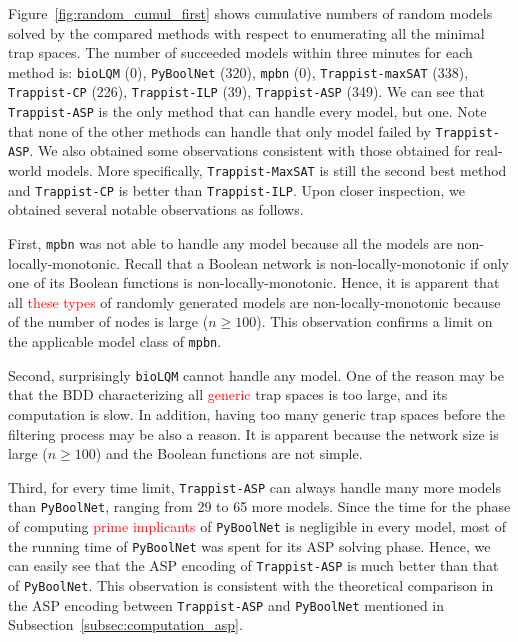 \documentclass[preprint,12pt]{elsarticle}
\newcommand{\change}[1]{\textcolor{red}{#1}}
\begin{document}
Figure~\ref{fig:random_cumul_first} shows cumulative numbers of random models solved by the compared methods with respect to enumerating all the minimal trap spaces.
The number of succeeded models within three minutes for each method is: \texttt{bioLQM} (0), \texttt{PyBoolNet} (320), \texttt{mpbn} (0), \texttt{Trappist-maxSAT} (338), \texttt{Trappist-CP} (226), \texttt{Trappist-ILP} (39), \texttt{Trappist-ASP} (349).
We can see that \texttt{Trappist-ASP} is the only method that can handle every model, but one.
Note that none of the other methods can handle that only model failed by \texttt{Trappist-ASP}.
We also obtained some observations consistent with those obtained for real-world models.
More specifically, \texttt{Trappist-MaxSAT} is still the second best method and \texttt{Trappist-CP} is better than \texttt{Trappist-ILP}.
Upon closer inspection, we obtained several notable observations as follows.

First, \texttt{mpbn} was not able to handle any model because all the models are non-locally-monotonic.
Recall that a Boolean network is non-locally-monotonic if only one of its Boolean functions is non-locally-monotonic.
Hence, it is apparent that all \change{these types} of randomly generated models are non-locally-monotonic because of the number of nodes is large (\(n \geq 100\)).
This observation confirms a limit on the applicable model class of \texttt{mpbn}.

Second, surprisingly \texttt{bioLQM} cannot handle any model.
One of the reason may be that the BDD characterizing all \change{generic} trap spaces is too large, and its computation is slow.
In addition, having too many generic trap spaces before the filtering process may be also a reason.
It is apparent because the network size is large (\(n \geq 100\)) and the Boolean functions are not simple.

Third, for every time limit, \texttt{Trappist-ASP} can always handle many more models than \texttt{PyBoolNet}, ranging from 29 to 65 more models.
Since the time for the phase of computing \change{prime implicants} of \texttt{PyBoolNet} is negligible in every model, most of the running time of \texttt{PyBoolNet} was spent for its ASP solving phase.
Hence, we can easily see that the ASP encoding of \texttt{Trappist-ASP} is much better than that of \texttt{PyBoolNet}.
This observation is consistent with the theoretical comparison in the ASP encoding between \texttt{Trappist-ASP} and \texttt{PyBoolNet} mentioned in Subsection~\ref{subsec:computation_asp}.
\end{document}
